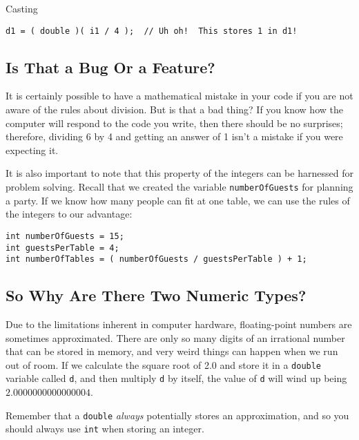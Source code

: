 \begin{trap}{Casting}
\begin{verbatim}
d1 = ( double )( i1 / 4 );  // Uh oh!  This stores 1 in d1!
\end{verbatim}
\end{trap}

\subsection{Is That a Bug Or a Feature?}

It is certainly possible to have a mathematical mistake in your code if you are not aware of the rules about division.  But is that a bad thing?  If you know how the computer will respond to the code you write, then there should be no surprises; therefore, dividing 6 by 4 and getting an answer of 1 isn't a mistake if you were expecting it.

It is also important to note that this property of the integers can be harnessed for problem solving.  Recall that we created the variable \lstinline{numberOfGuests} for planning a party.  If we know how many people can fit at one table, we can use the rules of the integers to our advantage:

\begin{verbatim}
int numberOfGuests = 15;
int guestsPerTable = 4;
int numberOfTables = ( numberOfGuests / guestsPerTable ) + 1;
\end{verbatim}

\subsection{So Why Are There Two Numeric Types?}

Due to the limitations inherent in computer hardware, floating-point numbers are sometimes approximated.  There are only so many digits of an irrational number that can be stored in memory, and very weird things can happen when we run out of room.  If we calculate the square root of 2.0 and store it in a \texttt{double} variable called \texttt{d}, and then multiply \texttt{d} by itself, the value of \texttt{d} will wind up being $2.0000000000000004$.

Remember that a \texttt{double} \textit{always} potentially stores an approximation, and so you should always use \texttt{int} when storing an integer.
